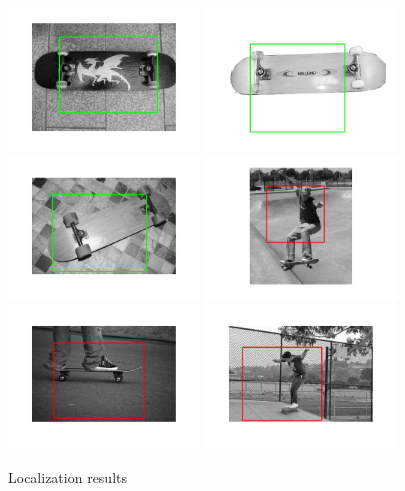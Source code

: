 \documentclass[10pt,twocolumn,letterpaper]{article}
\begin{document}
\begin{figure}
\begin{center}
\end{center}
\begin{center}
    \includegraphics[width=2in]{loc_sk_1.jpg}
    \includegraphics[width=2in]{loc_sk_2.jpg}
    \includegraphics[width=2in]{loc_sk_3.jpg}
    \includegraphics[width=2in]{loc_sk_4.jpg}
    \includegraphics[width=2in]{loc_sk_5.jpg}
    \includegraphics[width=2in]{loc_sk_6.jpg}
\end{center}
   \caption{Localization results}
\label{fig:final}
\end{figure}
\end{document}

